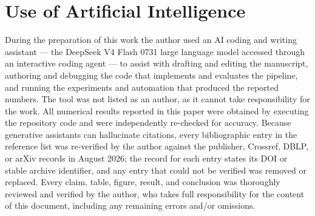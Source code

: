 \documentclass[11pt]{article}
\begin{document}
\section*{Use of Artificial Intelligence}
During the preparation of this work the author used an AI coding and writing assistant --- the DeepSeek V4 Flash 0731 large language model accessed through an interactive coding agent --- to assist with drafting and editing the manuscript, authoring and debugging the code that implements and evaluates the pipeline, and running the experiments and automation that produced the reported numbers. The tool was not listed as an author, as it cannot take responsibility for the work. All numerical results reported in this paper were obtained by executing the repository code and were independently re-checked for accuracy. Because generative assistants can hallucinate citations, every bibliographic entry in the reference list was re-verified by the author against the publisher, Crossref, DBLP, or arXiv records in August 2026; the record for each entry states its DOI or stable archive identifier, and any entry that could not be verified was removed or replaced. Every claim, table, figure, result, and conclusion was thoroughly reviewed and verified by the author, who takes full responsibility for the content of this document, including any remaining errors and/or omissions.
\end{document}
